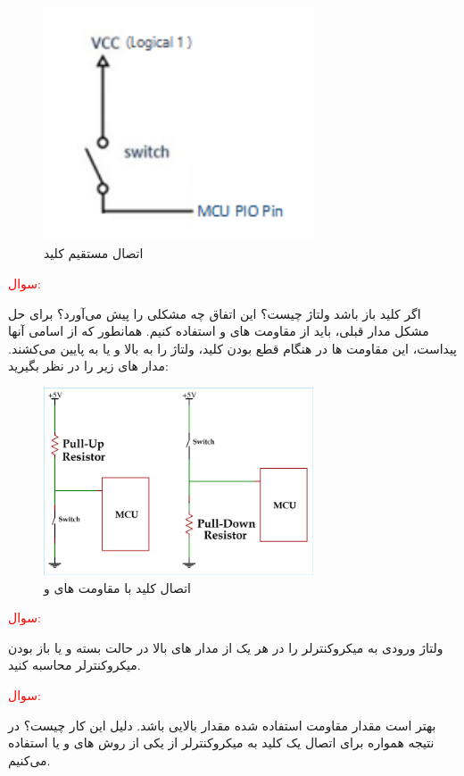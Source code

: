 \newline
\begin{figure}[h]
    \centering
    \includegraphics[width=8cm]{Switch-Direct.png}
    \caption{اتصال مستقیم کلید}
    \label{fig:swtch-dir}
\end{figure}
\newline
\textcolor{red}{\begin{nas}سوال: \end{nas}}
اگر کلید باز باشد ولتاژ  چیست؟ این اتفاق چه مشکلی را پیش می‌آورد؟
\newline
برای حل مشکل مدار قبلی، باید از مقاومت های  و  استفاده کنیم. همانطور که از اسامی آنها پیداست، این مقاومت ها در هنگام قطع بودن کلید، ولتاژ را به بالا و یا به پایین می‌کشند. مدار های زیر را در نظر بگیرید:
\newline
\begin{figure}[h]
    \centering
    \includegraphics[width=8cm]{PUP-PDOWN.png}
    \caption{اتصال کلید با مقاومت های  و }
    \label{fig:swtch-dir}
\end{figure}
\newline
\textcolor{red}{\begin{nas}سوال: \end{nas}}
ولتاژ ورودی به میکروکنترلر را در هر یک از مدار های بالا در حالت بسته و یا باز بودن میکروکنترلر محاسبه کنید.
\newline
\textcolor{red}{\begin{nas}سوال: \end{nas}}
بهتر است مقدار مقاومت استفاده شده مقدار بالایی باشد. دلیل این کار چیست؟
\newline
در نتیجه همواره برای اتصال یک کلید به میکروکنترلر از یکی از روش های  و یا  استفاده می‌کنیم.
\newline



